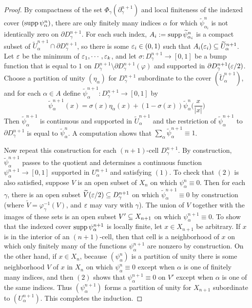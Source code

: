 \begin{proof}
By compactness of the set $\varPhi_\gamma(\partial_\gamma^{n+1})$ and local finiteness of the indexed cover $(\mathrm{supp}\,\psi^n_\alpha)$, there are only finitely many indices  $\alpha$ for which $\widetilde{\psi}_{\alpha_i}^n$ is not identically zero on $\partial D_\gamma^{n+1}$. For each such index, $A_i:=\mathrm{supp}\,\widetilde{\psi}_{\alpha_i}^n$ is a compact subset
of $\widetilde{U}_{\alpha}^{n+1}\cap\partial D^{n+1}_\gamma$, so there is some $\varepsilon_i\in(0,1)$ such that $A_i(\varepsilon_i)\subseteq\widetilde{U}^{n+1}_\alpha$. Let $\varepsilon$ be the minimum of $\varepsilon_1,\cdots,\varepsilon_k$, and let $\sigma:D^{n+1}_\gamma\to[0,1]$ be a bump function that is equal to $1$ on $D_\gamma^{n+1}\setminus\partial D^{n+1}_\gamma(\varphi)$ and supported in $\partial D^{n+1}_\gamma(\varepsilon/2)$. Choose a partition of unity $(\eta_\alpha)$ for $D_\gamma^{n+1}$ subordinate to the cover $(\widetilde{U}^{n+1}_\alpha)$, and for each $\alpha\in A$ define $\widetilde{\psi}_\alpha^{n+1}:D_\gamma^{n+1}\to[0,1]$ by
\[\widetilde{\psi}^{n+1}_\alpha(x)=\sigma(x)\eta_\alpha(x)+(1-\sigma(x))\widetilde{\psi}_\alpha^n\Big(\dfrac{x}{|x|}\Big)\]
Then $\widetilde{\psi}_\alpha^{n+1}$ is continuous and supported in $\widetilde{U}_\alpha^{n+1}$ and the restriction of $\widetilde{\psi}_\alpha^{n+1}$ to $\partial D_\gamma^{n+1}$ is equal to $\widetilde{\psi}_\alpha^{n}$. A computation shows that $\sum_\alpha\widetilde{\psi}_\alpha^{n+1}\equiv 1$.\par
Now repeat this construction for each $(n+1)$-cell $D_\gamma^{n+1}$. By construction, $\widetilde{\psi}_\alpha^{n+1}$ passes to the quotient and determines a continuous function $\psi_\alpha^{n+1}\to[0,1]$ supported in $U_\alpha^{n+1}$ and satisfying $(1)$. To check that $(2)$ is also satisfied, suppose $V$ is an open subset of $X_n$ on which $\psi_\alpha^n\equiv 0$. Then for each $\gamma$, there is an open subset $\widetilde{V}(\varepsilon/2)\subseteq D_\gamma^{n+1}$ on which $\widetilde{\psi}_\alpha^{n+1}\equiv0$ by construction (where $\widetilde{V}=\varphi^{-1}_\gamma(V)$, and $\varepsilon$ may vary with $\gamma$). The union of $V$ together with the images of these sets is an open subset $V'\subseteq X_{n+1}$ on which $\psi_\alpha^{n+1}\equiv0$. To show that the indexed cover $\mathrm{supp}\,\psi^{n+1}_\alpha$ is locally finite, let $x\in X_{n+1}$ be arbitrary. If $x$ is in the interior of an $(n+1)$-cell, then that cell is a neighborhood of $x$ on which only finitely many of the functions $\psi_\alpha^{n+1}$ are nonzero by construction. On the other hand, if $x\in X_n$, because $(\psi_\alpha^n)$ is a partition of unity there is some neighborhood $V$ of $x$ in $X_n$ on which $\psi^n_\alpha\equiv0$ except when $\alpha$ is one of finitely many indices, and then $(2)$ shows that $\psi_\alpha^{n+1}\equiv0$ on $V'$ except when $\alpha$ is one of the same indices. Thus $(\psi_\alpha^{n+1})$ forms a partition of unity for $X_{n+1}$ subordinate to $(U_\alpha^{n+1})$. This completes the induction.\par

\end{proof}
